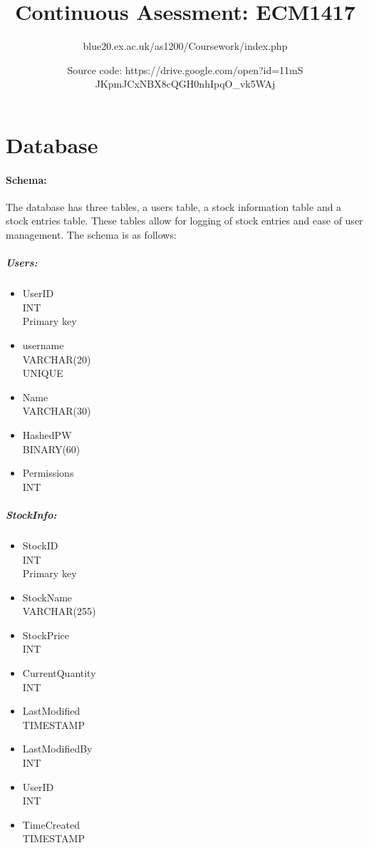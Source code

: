 \documentclass[12pt,a4paper]{report}
\title{Continuous Asessment: ECM1417}
\author{blue20.ex.ac.uk/as1200/Coursework/index.php
	\and
	Source code: https://drive.google.com/open?id=11mS\\JKpmJCxNBX8cQGH0nhIpqO\_vk5WAj}
\begin{document}
	\maketitle
	\newpage
	\section{Database}
	\paragraph{Schema:}
	The database has three tables, a users table, a stock information table and a stock entries table. These tables allow for logging of stock entries and ease of user management. The schema is as follows:
	\begin{multicols}{3}
	\subparagraph{Users:}
	\begin{itemize}
		\item UserID \\ INT \\ Primary key
		\item username \\ VARCHAR(20) \\ UNIQUE
		\item Name \\ VARCHAR(30)
		\item HashedPW \\ BINARY(60)
		\item Permissions \\ INT
	\end{itemize}
	\columnbreak
	\subparagraph{StockInfo:}
	\begin{itemize}
		\item StockID \\ INT \\ Primary key
		\item StockName \\ VARCHAR(255)
		\item StockPrice \\ INT
		\item CurrentQuantity \\ INT
		\item LastModified \\ TIMESTAMP
		\item LastModifiedBy \\ INT
		\item UserID \\ INT
		\item TimeCreated \\ TIMESTAMP

\end{itemize}
\end{multicols}
\end{document}

